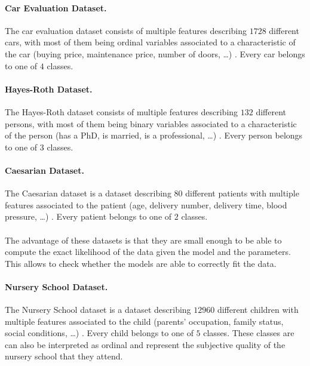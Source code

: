 \paragraph{Car Evaluation Dataset.} The car evaluation dataset consists of multiple features describing $1728$ different cars, with most of them being ordinal variables associated to a characteristic of the car (buying price, maintenance price, number of doors, \ldots) \citep{misc_car_evaluation_19}. Every car belongs to one of $4$ classes.
\paragraph{Hayes-Roth Dataset.} The Hayes-Roth dataset consists of multiple features describing $132$ different persons, with most of them being binary variables associated to a characteristic of the person (has a PhD, is married, is a professional, \ldots) \citep{misc_hayes_roth_44}. Every person belongs to one of $3$ classes.
\paragraph{Caesarian Dataset.} The Caesarian dataset is a dataset describing $80$ different patients with multiple features associated to the patient (age, delivery number, delivery time, blood pressure, \ldots) \citep{misc_caesarian_section_classification_dataset_472}. Every patient belongs to one of $2$ classes. \\ \\
The advantage of these datasets is that they are small enough to be able to compute the exact likelihood of the data given the model and the parameters. This allows to check whether the models are able to correctly fit the data.
\paragraph{Nursery School Dataset.} The Nursery School dataset is a dataset describing $12960$ different children with multiple features associated to the child (parents' occupation, family status, social conditions, \ldots) \citep{misc_nursery_76}. Every child belongs to one of $5$ classes. 
These classes are can also be interpreted as ordinal and represent the subjective quality of the nursery school that they attend. \\ \\

